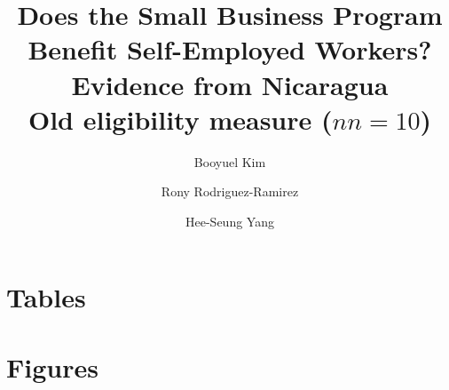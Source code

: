\documentclass{article}
\begin{document}
\title{Does the Small Business Program Benefit Self-Employed Workers?  Evidence from Nicaragua \\ Old eligibility measure ($nn = 10$)} 
\author{Booyuel Kim \and Rony Rodriguez-Ramirez \and Hee-Seung Yang}
\maketitle
\listoftables
\listoffigures
\newpage

\section{Tables}


\newpage 
\section{Figures}


\end{document}

